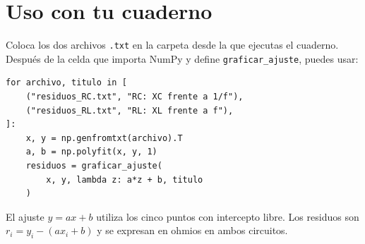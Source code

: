 \documentclass[10pt,letterpaper]{article}
\begin{document}
\section*{Uso con tu cuaderno}
Coloca los dos archivos \texttt{.txt} en la carpeta desde la que ejecutas el cuaderno.
Después de la celda que importa NumPy y define \texttt{graficar\_ajuste}, puedes usar:
\begin{verbatim}
for archivo, titulo in [
    ("residuos_RC.txt", "RC: XC frente a 1/f"),
    ("residuos_RL.txt", "RL: XL frente a f"),
]:
    x, y = np.genfromtxt(archivo).T
    a, b = np.polyfit(x, y, 1)
    residuos = graficar_ajuste(
        x, y, lambda z: a*z + b, titulo
    )
\end{verbatim}
El ajuste $y=ax+b$ utiliza los cinco puntos con intercepto libre.
Los residuos son $r_i=y_i-(ax_i+b)$ y se expresan en ohmios en ambos circuitos.
\end{document}
